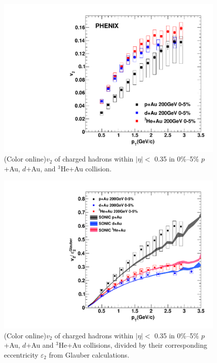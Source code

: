 \documentclass[%
reprint,
showpacs,preprintnumbers,
 amsmath,amssymb,
 aps,
]{revtex4-1}
\newcommand{\dau}{\mbox{$d$+Au}\xspace}
\newcommand{\pau}{\mbox{$p$+Au}\xspace}
\newcommand{\hau}{\mbox{$^3\text{He}$+Au}\xspace}
\begin{document}
\begin{figure}[htbp]
  \includegraphics[scale=0.45]{Figures/figure3.pdf}
  \caption{(Color online)$v_2$ of charged hadrons within $|\eta| <$ 0.35 in 0\%--5\% \pau, \dau, and \hau collision.}
\label{fig:figure3}
\end{figure}

\begin{figure}[htbp]
  \includegraphics[scale=0.45]{Figures/figure4.pdf}
  \caption{(Color online)$v_2$ of charged hadrons within $|\eta| <$ 0.35 in 0\%--5\% \pau, \dau and \hau collisions, divided by their corresponding eccentricity $\varepsilon_2$ from Glauber calculations.}
\label{fig:figure4}
\end{figure}
\end{document}

